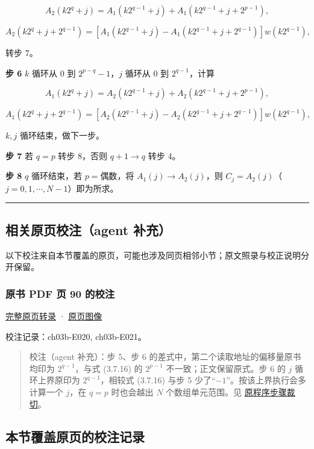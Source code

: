 \documentclass[
  10pt,
  fontset=fandol]{ctexart}
\begin{document}
\[
A_2(k2^q+j)=A_1(k2^{q-1}+j)+A_1(k2^{q-1}+j+2^{p-1}),
\]

\[
A_2(k2^q+j+2^{q-1})=[A_1(k2^{q-1}+j)-A_1(k2^{q-1}+j+2^{q-1})]w(k2^{q-1}),
\]

转步 7。

\textbf{步 6} \(k\) 循环从 \(0\) 到 \(2^{p-q}-1\)，\(j\) 循环从 \(0\) 到 \(2^{q-1}\)，计算

\[
A_1(k2^q+j)=A_2(k2^{q-1}+j)+A_2(k2^{q-1}+j+2^{p-1}),
\]

\[
A_1(k2^q+j+2^{q-1})=[A_2(k2^{q-1}+j)-A_2(k2^{q-1}+j+2^{q-1})]w(k2^{q-1}),
\]

\(k,j\) 循环结束，做下一步。

\textbf{步 7} 若 \(q=p\) 转步 8，否则 \(q+1\to q\) 转步 4。

\textbf{步 8} \(q\) 循环结束，若 \(p=\text{偶数}\)，将 \(A_1(j)\to A_2(j)\)，则 \(C_j=A_2(j)\)（\(j=0,1,\cdots,N-1\)）即为所求。

\begin{center}\rule{0.5\linewidth}{0.5pt}\end{center}

\subsection{相关原页校注（agent 补充）}\label{ux76f8ux5173ux539fux9875ux6821ux6ce8agent-ux8865ux5145}

以下校注来自本节覆盖的原页，可能也涉及同页相邻小节；原文照录与校正说明分开保留。

\subsubsection{原书 PDF 页 90 的校注}\label{ux539fux4e66-pdf-ux9875-90-ux7684ux6821ux6ce8}

\href{../pages/pdf-090.md}{完整原页转录} · \href{../../source-images/pdf-090.jpeg}{原页图像}

校注记录：ch03b-E020, ch03b-E021。

\begin{quote}
校注（agent 补充）：步 5、步 6 的差式中，第二个读取地址的偏移量原书均印为 \(2^{q-1}\)，与式 (3.7.16) 的 \(2^{p-1}\) 不一致；正文保留原式。步 6 的 \(j\) 循环上界原印为 \(2^{q-1}\)，相较式 (3.7.16) 与步 5 少了``\(-1\)''。按该上界执行会多计算一个 \(j\)，在 \(q=p\) 时也会越出 \(N\) 个数组单元范围。见 \href{../assets/ch03b/p090-fft-steps.png}{原程序步骤裁切}。
\end{quote}

\subsection{本节覆盖原页的校注记录}\label{ux672cux8282ux8986ux76d6ux539fux9875ux7684ux6821ux6ce8ux8bb0ux5f55}
\end{document}
